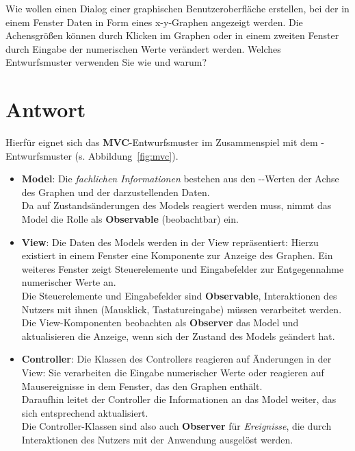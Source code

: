 Wie wollen einen Dialog einer graphischen Benutzeroberfläche erstellen, bei der in einem Fenster Daten in Form eines x-y-Graphen angezeigt werden. Die Achensgrößen können durch Klicken im Graphen oder in einem zweiten Fenster durch Eingabe der numerischen Werte verändert werden.
Welches Entwurfsmuster verwenden Sie wie und warum?

\section*{Antwort}
Hierfür eignet sich das \textbf{MVC}-Entwurfsmuster im Zusammenspiel mit dem -Entwurfsmuster (s. Abbildung~\ref{fig:mvc}).\\

\begin{itemize}
    \item \textbf{Model}: Die \textit{fachlichen Informationen} bestehen aus den --Werten der Achse des Graphen und der darzustellenden Daten.\\
    Da auf Zustandsänderungen des Models reagiert werden muss, nimmt das Model die Rolle als \textbf{Observable} (beobachtbar) ein.
    \item \textbf{View}: Die Daten des Models werden in der View repräsentiert: Hierzu existiert in einem Fenster eine Komponente zur Anzeige des Graphen.
    Ein weiteres Fenster zeigt Steuerelemente und Eingabefelder zur Entgegennahme numerischer Werte an.\\
    Die Steuerelemente und Eingabefelder sind \textbf{Observable}, Interaktionen des Nutzers mit ihnen (Mausklick, Tastatureingabe) müssen verarbeitet werden.\\
    Die View-Komponenten beobachten als \textbf{Observer} das Model und aktualisieren die Anzeige, wenn sich der Zustand des Models geändert hat.
    \item \textbf{Controller}: Die Klassen des Controllers reagieren auf Änderungen in der View: Sie verarbeiten die Eingabe numerischer Werte oder reagieren auf Mausereignisse in dem Fenster, das den Graphen enthält.\\
    Daraufhin leitet der Controller die Informationen an das Model weiter, das sich entsprechend aktualisiert.\\
    Die Controller-Klassen sind also auch \textbf{Observer} für \textit{Ereignisse}, die durch Interaktionen des Nutzers mit der Anwendung ausgelöst werden.
\end{itemize}


